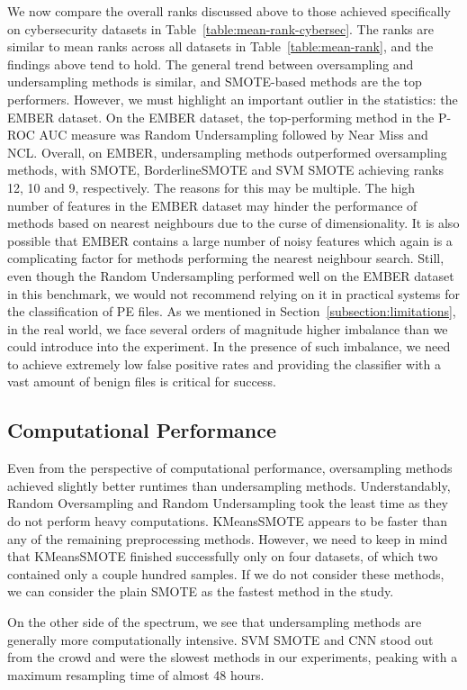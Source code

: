 \documentclass[conference]{IEEEtran}
\begin{document}
We now compare the overall ranks discussed above to those achieved specifically on cybersecurity
datasets in Table~\ref{table:mean-rank-cybersec}. The ranks are similar to mean ranks across all
datasets in Table~\ref{table:mean-rank}, and the findings above tend to hold. The general trend
between oversampling and undersampling methods is similar, and SMOTE-based methods are the top
performers. However, we must highlight an important outlier in the statistics: the EMBER dataset.
On the EMBER dataset, the top-performing method in the P-ROC AUC measure was Random Undersampling
followed by Near Miss and NCL. Overall, on EMBER, undersampling methods outperformed oversampling
methods, with SMOTE, BorderlineSMOTE and SVM SMOTE achieving ranks 12, 10 and 9, respectively. The
reasons for this may be multiple. The high number of features in the EMBER dataset may hinder the
performance of methods based on nearest neighbours due to the curse of dimensionality. It is also
possible that EMBER contains a large number of noisy features which again is a complicating factor
for methods performing the nearest neighbour search. Still, even though the Random Undersampling
performed well on the EMBER dataset in this benchmark, we would not recommend relying on it in
practical systems for the classification of PE files. As we mentioned in
Section~\ref{subsection:limitations}, in the real world, we face several orders of magnitude higher
imbalance than we could introduce into the experiment. In the presence of such imbalance, we need
to achieve extremely low false positive rates and providing the classifier with a vast amount of
benign files is critical for success.


\subsection{Computational Performance}

Even from the perspective of computational performance, oversampling methods achieved slightly
better runtimes than undersampling methods. Understandably, Random Oversampling and Random
Undersampling took the least time as they do not perform heavy computations. KMeansSMOTE appears to
be faster than any of the remaining preprocessing methods. However, we need to keep in mind that
KMeansSMOTE finished successfully only on four datasets, of which two contained only a couple
hundred samples. If we do not consider these methods, we can consider the plain SMOTE as the
fastest method in the study.

On the other side of the spectrum, we see that undersampling methods are generally more
computationally intensive. SVM SMOTE and CNN stood out from the crowd and were the slowest methods
in our experiments, peaking with a maximum resampling time of almost 48 hours.
\end{document}
